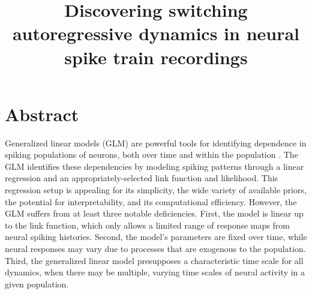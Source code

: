 \documentclass[aos,noinfoline]{imsart} %
\begin{document}
\begin{frontmatter}
\title{Discovering switching autoregressive dynamics in neural spike train recordings} 

\end{frontmatter}

\section{Abstract} 
Generalized linear models (GLM) are powerful tools for identifying dependence in spiking populations of neurons, both over time and within the population \cite{Paninski-2004}.  The GLM identifies these dependencies by modeling spiking patterns through a linear regression and an appropriately-selected link function and likelihood.  This regression setup is appealing for its simplicity, the wide variety of available priors, the potential for interpretability, and its computational efficiency.  However, the GLM suffers from at least three notable deficiencies.  First, the model is linear up to the link function, which only allows a limited range of response maps from neural spiking histories.  Second, the model's parameters are fixed over time, while neural responses may vary due to processes that are exogenous to the population.  Third, the generalized linear model presupposes a characteristic time scale for all dynamics, when there may be multiple, varying time scales of neural activity in a given population. 
\end{document}
